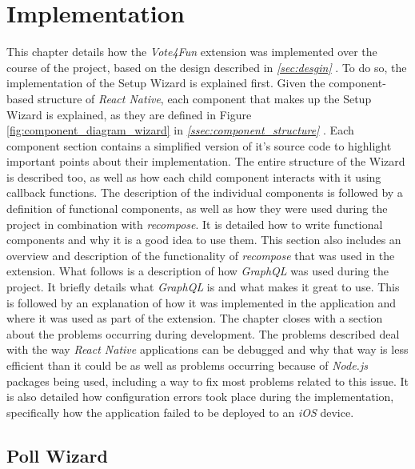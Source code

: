 \section{Implementation}
\label{sec:implementation}

This chapter details how the \textit{Vote4Fun} extension was implemented over the course of the project, based on the design described in \textit{\ref{sec:desgin} }. To do so, the implementation of the Setup Wizard is explained first. Given the component-based structure of \textit{React Native}, each component that makes up the Setup Wizard is explained, as they are defined in Figure \ref{fig:component_diagram_wizard} in \textit{\ref{ssec:component_structure} }. Each component section contains a simplified version of it's source code to highlight important points about their implementation. The entire structure of the Wizard is described too, as well as how each child component interacts with it using callback functions.
\newline
The description of the individual components is followed by a definition of functional components, as well as how they were used during the project in combination with \textit{recompose}. It is detailed how to write functional components and why it is a good idea to use them. This section also includes an overview and description of the functionality of \textit{recompose} that was used in the extension.
\newline
What follows is a description of how \textit{GraphQL} was used during the project. It briefly details what \textit{GraphQL} is and what makes it great to use. This is followed by an explanation of how it was implemented in the application and where it was used as part of the extension.
\newline
The chapter closes with a section about the problems occurring during development. The problems described deal with the way \textit{React Native} applications can be debugged and why that way is less efficient than it could be as well as problems occurring because of \textit{Node.js} packages being used, including a way to fix most problems related to this issue. It is also detailed how configuration errors took place during the implementation, specifically how the application failed to be deployed to an \textit{iOS} device.

\subsection{Poll Wizard}
\label{ssec:poll_wizard}

